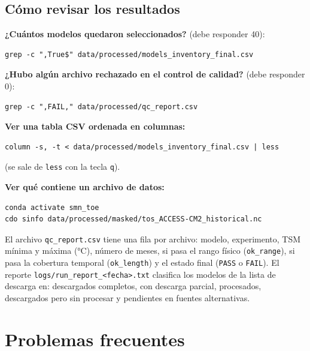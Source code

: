 \documentclass[11pt,a4paper]{article}
\begin{document}
\subsection{Cómo revisar los resultados}

\textbf{¿Cuántos modelos quedaron seleccionados?} (debe responder 40):
\begin{lstlisting}
grep -c ",True$" data/processed/models_inventory_final.csv
\end{lstlisting}

\textbf{¿Hubo algún archivo rechazado en el control de calidad?} (debe responder 0):
\begin{lstlisting}
grep -c ",FAIL," data/processed/qc_report.csv
\end{lstlisting}

\textbf{Ver una tabla CSV ordenada en columnas:}
\begin{lstlisting}
column -s, -t < data/processed/models_inventory_final.csv | less
\end{lstlisting}
(se sale de \texttt{less} con la tecla \texttt{q}).

\textbf{Ver qué contiene un archivo de datos:}
\begin{lstlisting}
conda activate smn_toe
cdo sinfo data/processed/masked/tos_ACCESS-CM2_historical.nc
\end{lstlisting}

El archivo \texttt{qc\_report.csv} tiene una fila por archivo: modelo, experimento, TSM mínima y máxima (°C), número de meses, si pasa el rango físico (\texttt{ok\_range}), si pasa la cobertura temporal (\texttt{ok\_length}) y el estado final (\texttt{PASS} o \texttt{FAIL}). El reporte \texttt{logs/run\_report\_<fecha>.txt} clasifica los modelos de la lista de descarga en: descargados completos, con descarga parcial, procesados, descargados pero sin procesar y pendientes en fuentes alternativas.



\clearpage
\section{Problemas frecuentes}
\end{document}
